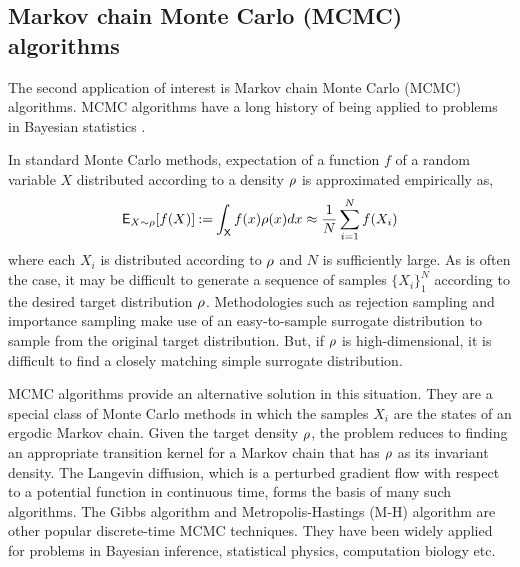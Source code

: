 \subsection{Markov chain Monte Carlo (MCMC) algorithms}
\label{s:mcmc}
The second application of interest is Markov chain Monte Carlo (MCMC) algorithms. MCMC algorithms have a long history of being applied to problems in Bayesian statistics \cite{}. 

In standard Monte Carlo methods, expectation of a function $f$ of a random variable $X$ distributed according to a density $\rho$ is approximated empirically as,
\begin{equation}
 \Expect_{X \sim \pr} [f(X)] \eqdef \int_\state f(x)\pr(x) dx \approx \frac{1}{N} \sum_{i=1}^N f(X_i)
 \label{e:intro_emp_avg} 
\end{equation}
where each $X_i$ is distributed according to $\rho$ and $N$ is sufficiently large. As is often the case, it may be difficult to generate a sequence of samples $\{X_i\}_1^N$ according to the desired target distribution $\rho$. Methodologies such as rejection sampling and importance sampling make use of an easy-to-sample surrogate distribution to sample from the original target distribution. But, if $\rho$ is high-dimensional, it is difficult to find a closely matching simple surrogate distribution. 

MCMC algorithms provide an alternative solution in this situation. They are a special class of Monte Carlo methods in which the samples $X_i$ are the states of an ergodic Markov chain. Given the target density $\rho$, the problem reduces to finding an appropriate transition kernel for a Markov chain that has $\rho$ as its invariant density. The Langevin diffusion, which is a perturbed gradient flow with respect to a potential function in continuous time, forms the basis of many such algorithms. The Gibbs algorithm \cite{tanwon87} and Metropolis-Hastings (M-H)  algorithm \cite{has70} are other popular discrete-time MCMC techniques. They have been widely applied for problems in Bayesian inference, statistical physics, computation biology etc.

